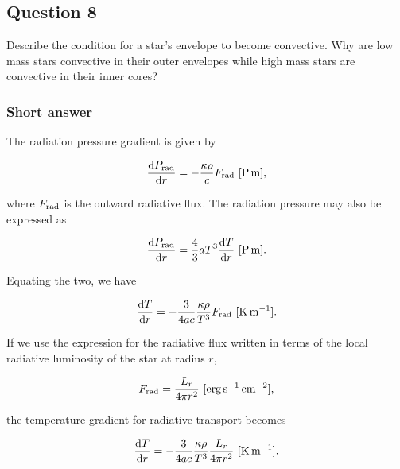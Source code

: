 \documentclass[a4paper,10pt]{article}
\begin{document}

\newpage
\subsection{Question 8}

Describe the condition for a star’s envelope to become convective. Why are low mass stars convective in their outer envelopes while high mass stars are convective in their inner cores?

\subsubsection{Short answer}

The radiation pressure gradient is given by 

\begin{align*}
    \frac{{\rm d}P_{\rm rad}}{{\rm d}r} = -\frac{\kappa\rho}{c}F_{\rm rad} ~ [{\rm P\,m}],
\end{align*}

{\noindent}where $F_{\rm rad}$ is the outward radiative flux. The radiation pressure may also be expressed as

\begin{align*}
    \frac{{\rm d}P_{\rm rad}}{{\rm d}r} = \frac{4}{3} aT^3 \frac{{\rm d}T}{{\rm d}r} ~ [{\rm P\,m}].
\end{align*}

{\noindent}Equating the two, we have

\begin{align*}
    \frac{{\rm d}T}{{\rm d}r} = -\frac{3}{4ac}\frac{\kappa\rho}{T^3}F_{\rm rad} ~ [{\rm K\,m^{-1}}].
\end{align*}

{\noindent}If we use the expression for the radiative flux written in terms of the local radiative luminosity of the star at radius $r$, 

\begin{align*}
    F_{\rm rad} = \frac{L_r}{4\pi r^2} ~ [{\rm erg\,s^{-1}\,cm^{-2}}],
\end{align*}

{\noindent}the temperature gradient for radiative transport becomes

\begin{align*}
    \frac{{\rm d}T}{{\rm d}r} = -\frac{3}{4ac}\frac{\kappa\rho}{T^3}\frac{L_r}{4\pi r^2} ~ [{\rm K\,m^{-1}}].
\end{align*}
\end{document}
